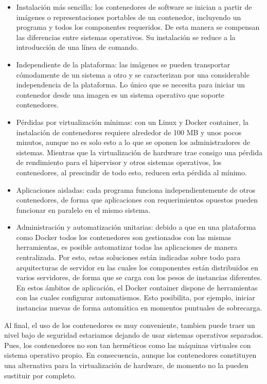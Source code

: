 \documentclass[%
 reprint,
 amsmath,amssymb,
 aps,
]{revtex4-1}
\begin{document}
\begin{itemize}
		\item Instalación más sencilla: los contenedores de software se inician a partir de imágenes o representaciones portables de un contenedor, incluyendo un programa y todos los componentes requeridos. De esta manera se compensan las diferencias entre sistemas operativos. Su instalación se reduce a la introducción de una línea de comando.
		\item Independiente de la plataforma: las imágenes se pueden transportar cómodamente de un sistema a otro y se caracterizan por una considerable independencia de la plataforma. Lo único que se necesita para iniciar un contenedor desde una imagen es un sistema operativo que soporte contenedores.
		\item Pérdidas por virtualización mínimas: con un Linux y Docker container, la instalación de contenedores requiere alrededor de 100 MB y unos pocos minutos, aunque no es solo esto a lo que se oponen los administradores de sistemas. Mientras que la virtualización de hardware trae consigo una pérdida de rendimiento para el hipervisor y otros sistemas operativos, los contenedores, al prescindir de todo esto, reducen esta pérdida al mínimo.
		\item Aplicaciones aisladas: cada programa funciona independientemente de otros contenedores, de forma que aplicaciones con requerimientos opuestos pueden funcionar en paralelo en el mismo sistema.
		\item Administración y automatización unitarias: debido a que en una plataforma como Docker todos los contenedores son gestionados con las mismas herramientas, es posible automatizar todas las aplicaciones de manera centralizada. Por esto, estas soluciones están indicadas sobre todo para arquitecturas de servidor en las cuales los componentes están distribuidos en varios servidores, de forma que se carga con los pesos de instancias diferentes. En estos ámbitos de aplicación, el Docker container dispone de herramientas con las cuales configurar automatismos. Esto posibilita, por ejemplo, iniciar instancias nuevas de forma automática en momentos puntuales de sobrecarga. \\
\end{itemize}
\par Al final, el uso de los contenedores es muy conveniente, tambien puede traer un nivel bajo de seguridad estariamos dejando de usar sistemas operativos separados. Pues, los contenedores no son tan herméticos como las máquinas virtuales con sistema operativo propio. En consecuencia, aunque los contenedores constituyen una alternativa para la virtualización de hardware, de momento no la pueden sustituir por completo.\\
\end{document}
